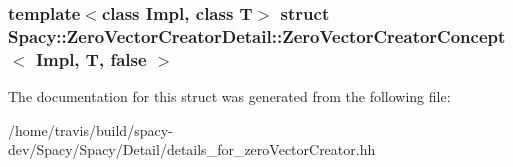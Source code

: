 \subsubsection*{template$<$class Impl, class T$>$ struct Spacy\-::\-Zero\-Vector\-Creator\-Detail\-::\-Zero\-Vector\-Creator\-Concept$<$ Impl, T, false $>$}



\-The documentation for this struct was generated from the following file\-:\begin{DoxyCompactItemize}
\item 
/home/travis/build/spacy-\/dev/\-Spacy/\-Spacy/\-Detail/details\-\_\-for\-\_\-zero\-Vector\-Creator.\-hh\end{DoxyCompactItemize}
